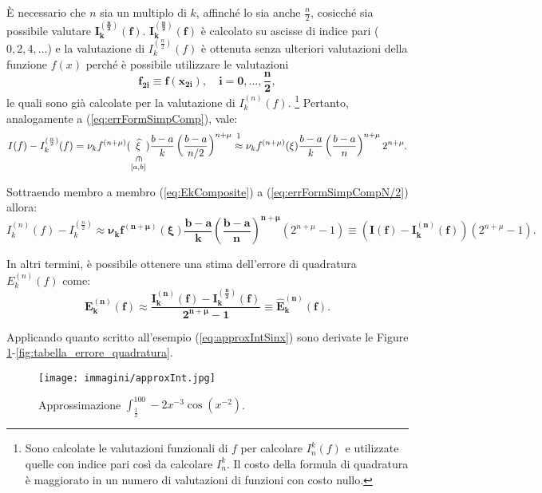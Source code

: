 È necessario che $n$ sia un multiplo di $k$, affinché lo sia anche $\frac{n}{2}$, cosicché sia possibile valutare $\boldsymbol{I_k^{(\frac{n}{2})}(f)}$. $\boldsymbol{I_k^{(\frac{n}{2})}(f)}$ è calcolato su ascisse di indice pari ($0,2,4,\hdots$) e la valutazione di $I_k^{(\frac{n}{2})}(f)$ è ottenuta senza ulteriori valutazioni della funzione $f(x)$ perché è possibile utilizzare le valutazioni
\begin{equation*}
    \boldsymbol{f_{2i}\equiv f(x_{2i}),\quad i=0,\hdots,\frac{n}{2}},
\end{equation*}
le quali sono già calcolate per la valutazione di $I_k^{(n)}(f)$. \footnote{Sono calcolate le valutazioni funzionali di $f$ per calcolare $I_n^k(f)$ e utilizzate quelle con indice pari così da calcolare $I_n^k$. Il costo della formula di quadratura è maggiorato in un numero di valutazioni di funzioni con costo nullo.} Pertanto, analogamente a (\ref{eq:errFormSimpComp}), vale:
\begin{equation}\label{eq:errFormSimpCompN/2}
    I(f)-I_k^{(\frac{n}{2})}(f)=\nu_k f^{(n+\mu)}(\into{\widehat\xi}{[a,b]})\frac{b-a}{k}\left(\frac{b-a}{n/2}\right)^{n+\mu}\overset{\footnotemark}{\approx}\nu_k f^{(n+\mu)}(\xi)\frac{b-a}{k}\left(\frac{b-a}{n}\right)^{n+\mu}2^{n+\mu}.
\end{equation}

Sottraendo membro a membro (\ref{eq:EkComposite}) a (\ref{eq:errFormSimpCompN/2}) allora:
\begin{equation*}
    I_k^{(n)}(f)-I_k^{(\frac{n}{2})}\approx\boldsymbol{\nu_kf^{(n+\mu)}(\xi)\frac{b-a}{k}\left(\frac{b-a}{n}\right)^{n+\mu}}(2^{n+\mu}-1)\equiv \left(\boldsymbol{I(f)-I_k^{(n)}(f)}\right)(2^{n+\mu}-1).
\end{equation*}

In altri termini, è possibile ottenere una stima dell'errore di quadratura $E_k^{(n)}(f)$ come:
\begin{equation*}
    \boldsymbol{E_k^{(n)}(f)\approx\frac{I_k^{(n)}(f)-I_k^{(\frac{n}{2})}(f)}{2^{n+\mu}-1}\equiv\widehat E_k^{(n)}(f)}.
\end{equation*}

Applicando quanto scritto all'esempio (\ref{eq:approxIntSinx}) sono derivate le Figure \ref{fig:approxInt}-\ref{fig:tabella_errore_quadratura}.

\begin{figure}
    \centering
    \texttt{[image: immagini/approxInt.jpg]}
    \caption{Approssimazione $\int_{\frac{1}{2}}^{100}-2x^{-3}\cos(x^{-2})$.}\label{fig:approxInt}
\end{figure}

